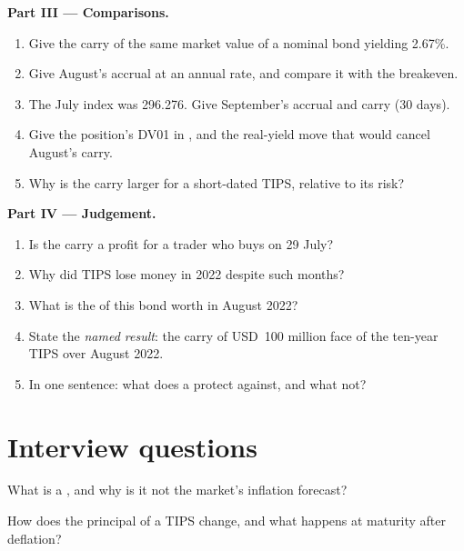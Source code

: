 \begin{problem}
\medskip\noindent\textbf{Part III --- Comparisons.}
\begin{enumerate}[resume]
\item Give the carry of the same market value of a nominal bond yielding 2.67\%.
\item Give August's accrual at an annual rate, and compare it with the
breakeven.
\item The July index was 296.276. Give September's accrual and carry (30 days).
\item Give the position's DV01 in , and the real-yield move that
would cancel August's carry.
\item Why is the carry larger for a short-dated TIPS, relative to its risk?
\end{enumerate}

\medskip\noindent\textbf{Part IV --- Judgement.}
\begin{enumerate}[resume]
\item Is the carry a profit for a trader who buys on 29 July?
\item Why did TIPS lose money in 2022 despite such months?
\item What is the  of this bond worth in August 2022?
\item State the \emph{named result}: the carry of USD~100 million face of the
ten-year TIPS over August 2022.
\item In one sentence: what does a  protect against, and what not?
\end{enumerate}
\end{problem}

\section{Interview questions}

\begin{interviewq}\label{iq:m2:inflation-markets:1}
What is a , and why is it not the market's inflation
forecast?
\end{interviewq}

\begin{interviewq}\label{iq:m2:inflation-markets:2}
How does the principal of a TIPS change, and what happens at maturity after
deflation?
\end{interviewq}

